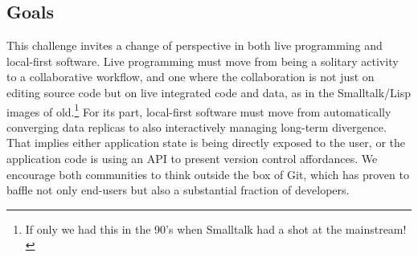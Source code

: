 \documentclass[english,submission]{programming}
\begin{document}
\subsection{Goals}
This challenge invites a change of perspective in both live programming and local-first software. Live programming must move from being a solitary activity to a collaborative workflow, and one where the collaboration is not just on editing source code but on live integrated code and data, as in the Smalltalk/Lisp images of old.\footnote{If only we had this in the 90's when Smalltalk had a shot at the mainstream!} For its part, local-first software must move from automatically converging data replicas to also interactively managing long-term divergence. That implies either application state is being directly exposed to the user, or the application code is using an API to present version control affordances. We encourage both communities to think outside the box of Git, which has proven to baffle not only end-users but also a substantial fraction of developers.


\newpage
\end{document}
